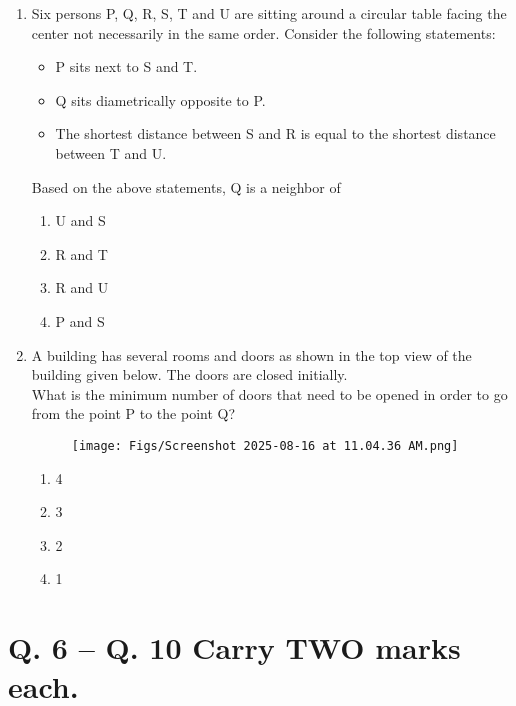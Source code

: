 \documentclass[12pt]{article}
\begin{document}
\begin{enumerate}
    \item Six persons P, Q, R, S, T and U are sitting around a circular table facing the
        center not necessarily in the same order. Consider the following statements: 
\begin{itemize}
\item P sits next to S and T.
\item Q sits diametrically opposite to P.
\item The shortest distance between S and R is equal to the shortest distance
    between T and U.
\end{itemize}

Based on the above statements, Q is a neighbor of

\begin{enumerate}
\item U and S
\item R and T
\item R and U
\item P and S
\end{enumerate}

\item A building has several rooms and doors as shown in the top view of the building
given below. The doors are closed initially. \\

What is the minimum number of doors that need to be opened in order to go
from the point P to the point Q?

\begin{figure}[H]
\centering
\texttt{[image: Figs/Screenshot 2025-08-16 at 11.04.36 AM.png]}
\caption{}
\end{figure}

\begin{enumerate}
\item 4
\item 3
\item 2
\item 1
\end{enumerate}
\end{enumerate}
\section*{Q. 6 – Q. 10 Carry TWO marks each.}
\end{document}
